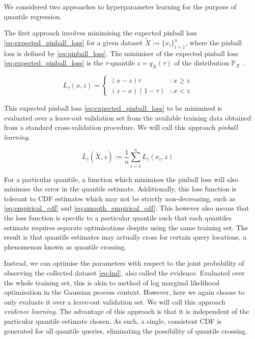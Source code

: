 \documentclass[twoside]{article} \usepackage{aistats2017}
\theoremstyle{definition}
\theoremstyle{theorem}
\newcommand{\rv}[1]{{#1}}
\newcommand{\ds}[1]{\tilde{#1}}
\begin{document}
	We considered two approaches to hyperparameter learning for the purpose of quantile regression.
	
	The first approach involves minimising the expected pinball loss \eqref{eq:expected_pinball_loss} for a given dataset $\ds{X} := \{x_{i}\}_{i = 1}^{n}$, where the pinball loss is defined by \eqref{eq:pinball_loss}. The minimiser of the expected pinball loss \eqref{eq:expected_pinball_loss} is the $\tau$-quantile $z = q_{\rv{X}}(\tau)$ of the distribution $\mathbb{P}_{\rv{X}}$ \citep{koenker1978regression}.
	
	\begin{equation}
		L_{\tau}(x, z) = \left\{ \begin{array}{lr}
			(x - z) \tau & : x \geq z \\
			(z - x) (1 - \tau) & : x < z
		\end{array} \right.
	\label{eq:pinball_loss}
	\end{equation}
	
	This expected pinball loss \eqref{eq:expected_pinball_loss} to be minimised is evaluated over a leave-out validation set from the available training data obtained from a standard cross-validation procedure. We will call this approach \textit{pinball learning}.
	
	\begin{equation}
		\bar{L}_{\tau}(\ds{X}, z) := \frac{1}{n} \sum_{i = 1}^{n} L_{\tau}(x_{i}, z)
	\label{eq:expected_pinball_loss}
	\end{equation}
	
	For a particular quantile, a function which minimises the pinball loss will also minimise the
	error in the quantile estimate. Additionally, this loss function is tolerant to CDF estimates which may not be strictly non-decreasing, such as \eqref{eq:empirical_cdf} and \eqref{eq:smooth_empirical_cdf}. This however also means that the loss function is specific to a particular quantile such that each quantiles estimate requires separate optimisations despite using the same training set. The result is that quantile estimates may actually cross for certain query locations, a phenomenon known as quantile crossing.
	
	Instead, we can optimise the parameters with respect to the joint probability of observing the collected dataset \eqref{eq:lml}, also called the evidence. Evaluated over the whole training set, this is akin to method of log marginal likelihood optimisation in the Gaussian process context. However, here we again choose to only evaluate it over a leave-out validation set. We will call this approach \textit{evidence learning}. The advantage of this approach is that it is independent of the particular quantile estimate chosen. As such, a single, consistent CDF is generated for all quantile queries, eliminating the possibility of quantile crossing. 
	
\end{document}
